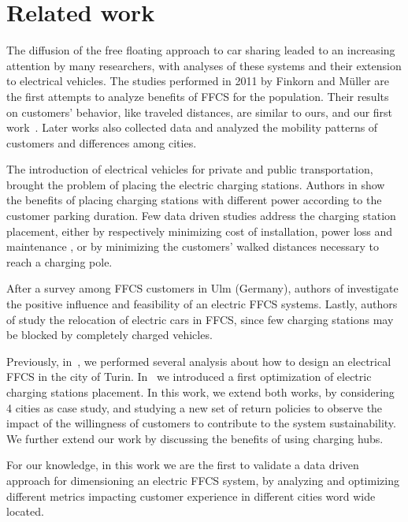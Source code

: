 \section{Related work}
\label{sec:related}

The diffusion of the free floating approach to car sharing leaded to an increasing attention by many researchers, with  analyses of
these systems and their extension to electrical vehicles. 
The studies performed  in 2011 by Finkorn and M\"{u}ller \cite{Firnkorn2011,FM12} are the first attempts to analyze benefits of FFCS for the population. Their results on customers' behavior, like traveled distances, are similar to ours, and our first work~\cite{ciociolaumap}.
Later works \cite{Car2GoGlobalAnalysis,CSandSocial,Schmoller2015} also collected data and analyzed the mobility patterns of customers and differences among cities.

The introduction of electrical vehicles for private and public transportation, brought the problem of placing the electric charging stations. Authors in \cite{ChargingStationForVehicularNetworks} show the benefits of placing charging stations with different power according to the customer parking duration. 
Few data driven studies address the charging station placement, either by respectively minimizing  cost of installation, power loss and maintenance  \cite{PlacementAndPowergrid,mipCSPpechino}, or by minimizing the customers' walked distances necessary to reach a charging pole\cite{placementAustin}. 

After a survey among FFCS customers in Ulm (Germany), authors of \cite{FM15}  investigate the positive influence and feasibility of an electric FFCS systems.
Lastly, authors of \cite{WB15} study the relocation of electric cars in FFCS, since few charging stations may be blocked by completely charged vehicles. 

Previously, in~\cite{taormina}, we performed several analysis about how to design an electrical FFCS in the city of Turin. In~\cite{maui} we introduced a first optimization of electric charging stations placement. In this work, we extend both works, by considering 4 cities as case study, and studying a new set of return policies to observe the impact of the willingness of customers to contribute to the system sustainability. We further extend our work by discussing the benefits of using charging hubs.

For our knowledge, in this work we are the first to validate a data driven approach for dimensioning an electric FFCS system, by analyzing and optimizing different metrics impacting customer experience in different cities word wide located.


